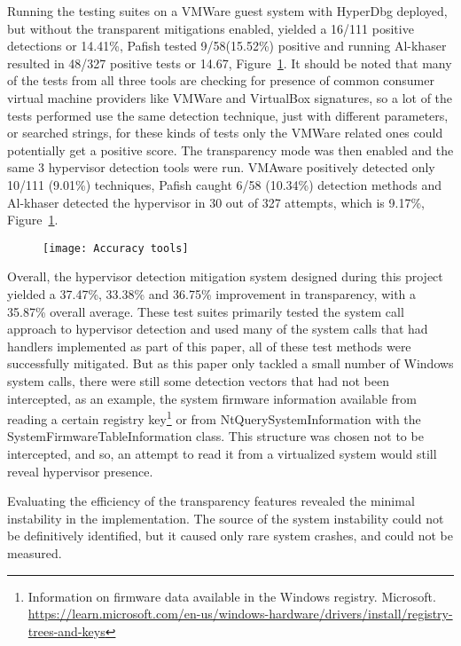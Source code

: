 Running the testing suites on a VMWare guest system with HyperDbg deployed, but without the transparent mitigations enabled, yielded a 16/111 positive detections or 14.41\%, 
Pafish tested 9/58(15.52\%) positive and running Al-khaser resulted in 48/327 positive tests or 14.67, Figure~\ref{fig:test_accuracy}.
It should be noted that many of the tests from all three tools are checking for presence of common consumer virtual machine providers like VMWare and VirtualBox signatures, 
so a lot of the tests performed use the same detection technique, just with different parameters, or searched strings, for these kinds of tests only the VMWare related ones could potentially get a positive score. 
The transparency mode was then enabled and the same 3 hypervisor detection tools were run. VMAware positively detected only 10/111 (9.01\%) techniques, Pafish caught 6/58 (10.34\%) detection methods and 
Al-khaser detected the hypervisor in 30 out of 327 attempts, which is 9.17\%, Figure~\ref{fig:test_accuracy}.
\begin{figure}[tbh]
    \texttt{[image: Accuracy tools]} %
    \label{fig:test_accuracy}
\end{figure}

Overall, the hypervisor detection mitigation system designed during this project yielded a 37.47\%, 33.38\% and 36.75\% improvement in transparency, 
with a 35.87\% overall average. These test suites primarily tested the system call approach to hypervisor detection and used many of the system calls that had handlers implemented as part of this paper, 
all of these test methods were successfully mitigated. But as this paper only tackled a small number of Windows system calls, there were still some detection vectors that had not been intercepted, 
as an example, the system firmware information available from reading a certain registry key\footnote{Information on firmware data available in the Windows registry. Microsoft. \url{https://learn.microsoft.com/en-us/windows-hardware/drivers/install/registry-trees-and-keys}} 
or from NtQuerySystemInformation with the SystemFirmwareTableInformation class. This structure was chosen not to be intercepted, and so, 
an attempt to read it from a virtualized system would still reveal hypervisor presence.

Evaluating the efficiency of the transparency features revealed the minimal instability in the implementation. The source of the system instability 
could not be definitively identified, but it caused only rare system crashes, and could not be measured.


